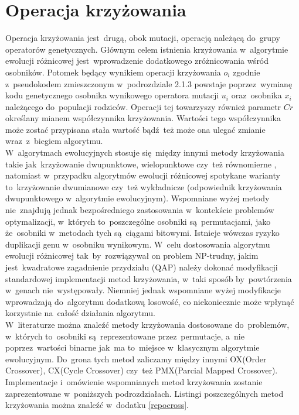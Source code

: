 \chapter{Operacja krzyżowania}\label{cha:pierwszyDokument}

Operacja krzyżowania jest~drugą, obok mutacji, operacją należącą do~grupy operatorów genetycznych. Głównym celem istnienia krzyżowania w~algorytmie ewolucji różnicowej jest~wprowadzenie dodatkowego zróżnicowania wśród osobników. Potomek będący wynikiem operacji krzyżowania $o_{i}$ zgodnie z~pseudokodem zmieszczonym w~podrozdziale 2.1.3 powstaje poprzez~wymianę kodu genetycznego osobnika wynikowego operatora mutacji $u_{i}$ oraz~osobnika $x_{i}$ należącego do~populacji rodziców. Operacji tej towarzyszy również parametr $C{r}$ określany mianem współczynnika krzyżowania. Wartości tego współczynnika może zostać przypisana stała wartość bądź~też może ona ulegać zmianie wraz~z~biegiem algorytmu. \\
W~algorytmach ewolucyjnych stosuje się~między innymi metody krzyżowania takie jak~krzyżowanie dwupunktowe, wielopunktowe czy~też równomierne \cite{diff2}, natomiast w~przypadku algorytmów ewolucji różnicowej spotykane warianty to~krzyżowanie dwumianowe czy~też wykładnicze (odpowiednik krzyżowania dwupunktowego w~algorytmie ewolucyjnym). Wspomniane wyżej metody nie~znajdują jednak bezpośredniego zastosowania w~kontekście problemów optymalizacji, w~których to~poszczególne osobniki są~permutacjami, jako że~osobniki w~metodach tych są~ciągami bitowymi. Istnieje wówczas ryzyko duplikacji genu w~osobniku wynikowym. W~celu dostosowania algorytmu ewolucji różnicowej tak~by~rozwiązywał on problem NP-trudny, jakim jest~kwadratowe zagadnienie przydziału (QAP) należy dokonać modyfikacji standardowej implementacji metod krzyżowania, w~taki sposób by~powtórzenia w~genach nie~występowały. Niemniej jednak wspomniane wyżej modyfikacje wprowadzają do~algorytmu dodatkową losowość, co niekoniecznie może wpłynąć korzystnie na~całość działania algorytmu. \\
W~literaturze \cite{cross} można znaleźć metody krzyżowania dostosowane do~problemów, w~których to~osobniki są~reprezentowane przez~permutacje, a~nie poprzez~wartości binarne jak~ma to~miejsce w~klasycznym algorytmie ewolucyjnym. Do~grona tych metod zaliczamy między innymi OX(Order Crossover), CX(Cycle Crossover) czy~też PMX(Parcial Mapped Crossover). Implementacje i~omówienie wspomnianych metod krzyżowania zostanie zaprezentowane w~poniższych podrozdziałach. Listingi poszczególnych metod krzyżowania można znaleźć w~dodatku \ref{repocross}.

